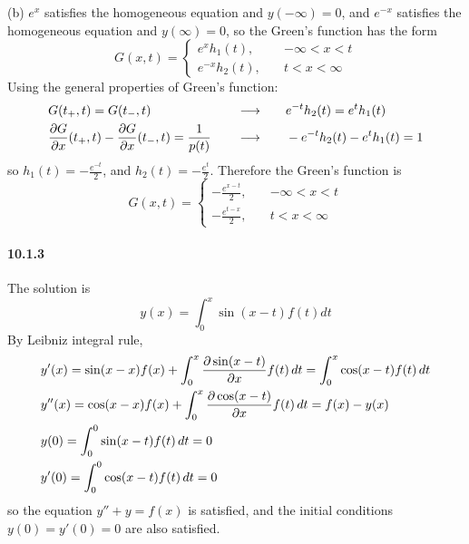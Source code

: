 \documentclass[a4paper]{article}
\begin{document}
(b) $e^x$ satisfies the homogeneous equation and $y(-\infty)=0$, and $e^{-x}$ satisfies the homogeneous equation and $y(\infty)=0$, so the Green's function has the form
\[
G(x,t)=
\begin{cases}
e^xh_1(t),\quad & -\infty<x<t\\
e^{-x}h_2(t),\quad & t<x<\infty
\end{cases}
\]
Using the general properties of Green's function:
\begin{alignat*}{3}
    & G(t_+,t)=G(t_-,t)\quad && \longrightarrow\quad && e^{-t}h_2(t)=e^th_1(t) \\
    & \frac{\partial G}{\partial x}(t_+,t)-\frac{\partial G}{\partial x}(t_-,t)=\frac{1}{p(t)}\quad && \longrightarrow\quad && -e^{-t}h_2(t)-e^th_1(t)=1
\end{alignat*}
so $h_1(t)=-\frac{e^{-t}}{2}$, and $h_2(t)=-\frac{e^t}{2}$. Therefore the Green's function is
\[
G(x,t)=
\begin{cases}
-\frac{e^{x-t}}{2},\quad & -\infty<x<t\\[5pt]
-\frac{e^{t-x}}{2},\quad & t<x<\infty
\end{cases}
\]

\paragraph{10.1.3}
The solution is
\[
y(x)=\int_0^x\sin(x-t)f(t)dt
\]
By Leibniz integral rule,
\begin{align*}
    & y'(x)=\sin(x-x)f(x)+\int_0^x\frac{\partial\sin(x-t)}{\partial x}f(t)\,dt=\int_0^x\cos(x-t)f(t)\,dt\\
    & y''(x)=\cos(x-x)f(x)+\int_0^x\frac{\partial\cos(x-t)}{\partial x}f(t)\,dt=f(x)-y(x)\\
    & y(0)=\int_0^0\sin(x-t)f(t)\,dt=0\\
    & y'(0)=\int_0^0\cos(x-t)f(t)\,dt=0
\end{align*}
so the equation $y''+y=f(x)$ is satisfied, and the initial conditions $y(0)=y'(0)=0$ are also satisfied.
\end{document}

